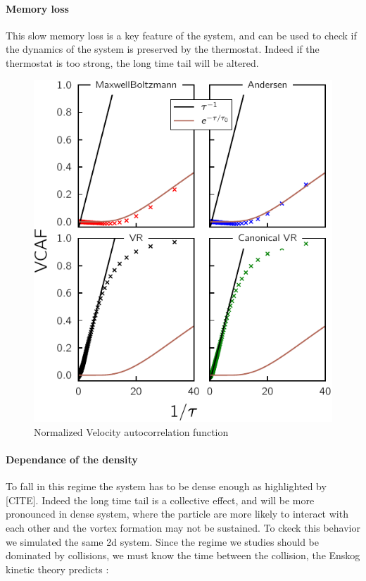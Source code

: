 \documentclass[ansiapaper]{report}
\begin{document}
\begin{multicols}{3}
\paragraph*{Memory loss}
This slow memory loss is a key feature of the system, and can be used to check if the dynamics of the system is preserved by the thermostat. Indeed if the thermostat is too strong, the long time tail will be altered.
\begin{figure}[H]
    \begin{center}
        \includegraphics[width=1\linewidth]{figures/velocity_autocorrelation.pdf}
    \end{center}
    \caption{Normalized Velocity autocorrelation function}\label{fig:VCAF-th}
\end{figure}


\paragraph*{Dependance of the density}

To fall in this regime the system has to be dense enough as highlighted by [CITE]. Indeed the long time tail is a collective effect, and will be more pronounced in dense system, where the particle are more likely to interact with each other and the vortex formation may not be sustained. To ckeck this behavior we simulated the same 2d system. Since the regime we studies should be dominated by collisions, we must know the time between the collision, the Enskog kinetic theory predicts : 


\end{multicols}
\end{document}
